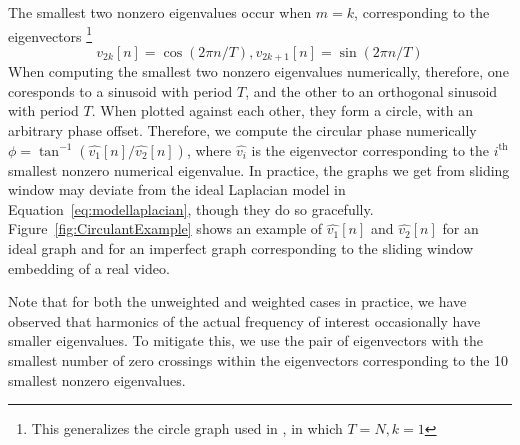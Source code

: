 \documentclass{article}
\begin{document}
The smallest two nonzero eigenvalues occur when $m = k$, corresponding to the eigenvectors \footnote{This generalizes the circle graph used in \cite{averbuch2015ringit}, in which $T = N, k = 1$} 
\begin{equation}
v_{2k}[n] = \cos(2 \pi n / T), v_{2k+1}[n] = \sin(2 \pi n / T)
\end{equation}
When computing the smallest two nonzero eigenvalues numerically, therefore, one coresponds to a sinusoid with period $T$, and the other to an orthogonal sinusoid with period $T$.  When plotted against each other, they form a circle, with an arbitrary phase offset.  Therefore, we compute the circular phase numerically $\phi = \tan^{-1}(\hat{v_1}[n] / \hat{v_2}[n])$, where $\hat{v_i}$ is the eigenvector corresponding to the $i^\text{th}$ smallest nonzero numerical eigenvalue.  In practice, the graphs we get from sliding window may deviate from the ideal Laplacian model in Equation~\ref{eq:modellaplacian}, though they do so gracefully.  Figure~\ref{fig:CirculantExample} shows an example of $\hat{v_1}[n]$ and $\hat{v_2}[n]$ for an ideal graph and for an imperfect graph corresponding to the sliding window embedding of a real video.  

Note that for both the unweighted and weighted cases in practice, we have observed that harmonics of the actual frequency of interest occasionally have smaller eigenvalues.  To mitigate this, we use the pair of eigenvectors with the smallest number of zero crossings within the eigenvectors corresponding to the 10 smallest nonzero eigenvalues.
\end{document}
